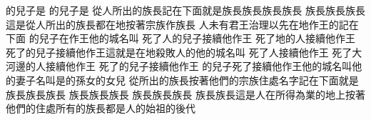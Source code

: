 的兒子是\chientien{}\chientien{}\chuan 
{}的兒子是\chientien{}\chuan 
{}從人所出的族長\chientien 記在下面\yuentien 就是族長\chientien{}族長\chientien{}族長\chientien{}族長\chientien 
{}族長\chientien{}族長\chientien{}族長\yuentien 這是從人所出的族長\chientien 都在地\chientien 按著宗族作族長\chuan\Chuan
{}人未有君王治理以先\chientien 在地作王的\chientien 記在下面\yuentien 
{}的兒子在作王\chientien 他的城名叫\chuan 
{}死了\chientien{}人\chientien{}的兒子接續他作王\chuan 
{}死了\chientien{}地的人接續他作王\chuan 
{}死了\chientien{}的兒子接續他作王\yuentien 這就是在地殺敗人的\chientien 他的城名叫\chuan 
{}死了\chientien{}人接續他作王\chuan 
{}死了\chientien 大河邊的人接續他作王\chuan 
{}死了\chientien{}的兒子接續他作王\chuan 
{}的兒子死了\chientien{}接續他作王\chientien 他的城名叫\yuentien 他的妻子名叫\chientien 是的孫女\chientien{}的女兒\chuan\Chuan
{}從所出的族長\chientien 按著他們的宗族\chientien 住處\chientien 名字\chientien 記在下面\yuentien 就是族長\chientien{}族長\chientien{}族長\chientien 
{}族長\chientien{}族長\chientien{}族長\chientien 
{}族長\chientien{}族長\chientien{}族長\chientien 
{}族長\chientien{}族長\yuentien 這是人在所得為業的地上\chientien 按著他們的住處\chientien 所有的族長\chientien 都是人的始祖\chientien {}的後代\chuan 
